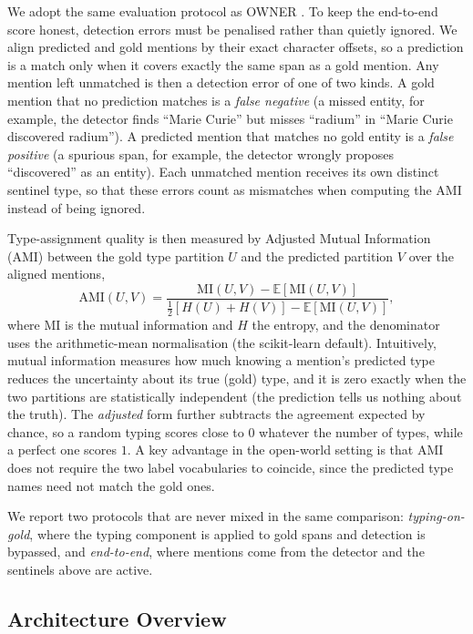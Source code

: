 \documentclass[pdflatex,sn-basic,Numbered]{sn-jnl}
\begin{document}
We adopt the same evaluation protocol as OWNER \cite{genest2025owner}.
To keep the end-to-end score honest, detection errors must be penalised rather than quietly ignored. We align predicted and gold mentions by their exact character offsets, so a prediction is a match only when it covers exactly the same span as a gold mention. Any mention left unmatched is then a detection error of one of two kinds. A gold mention that no prediction matches is a \emph{false negative} (a missed entity, for example, the detector finds ``Marie Curie'' but misses ``radium'' in ``Marie Curie discovered radium''). A predicted mention that matches no gold entity is a \emph{false positive} (a spurious span, for example, the detector wrongly proposes ``discovered'' as an entity). Each unmatched mention receives its own distinct sentinel type, so that these errors count as mismatches when computing the AMI instead of being ignored.

Type-assignment quality is then measured by Adjusted Mutual Information (AMI) \cite{vinh2010ami} between the gold type partition $U$ and the predicted partition $V$ over the aligned mentions,
\begin{equation}
\mathrm{AMI}(U,V)=\frac{\mathrm{MI}(U,V)-\mathbb{E}\!\left[\mathrm{MI}(U,V)\right]}{\tfrac12\!\left[H(U)+H(V)\right]-\mathbb{E}\!\left[\mathrm{MI}(U,V)\right]},
\end{equation}
where $\mathrm{MI}$ is the mutual information and $H$ the entropy, and the denominator uses the arithmetic-mean normalisation (the scikit-learn default). Intuitively, mutual information measures how much knowing a mention's predicted type reduces the uncertainty about its true (gold) type, and it is zero exactly when the two partitions are statistically independent (the prediction tells us nothing about the truth). The \emph{adjusted} form further subtracts the agreement expected by chance, so a random typing scores close to $0$ whatever the number of types, while a perfect one scores $1$. A key advantage in the open-world setting is that AMI does not require the two label vocabularies to coincide, since the predicted type names need not match the gold ones.

We report two protocols that are never mixed in the same comparison: \emph{typing-on-gold}, where the typing component is applied to gold spans and detection is bypassed, and \emph{end-to-end}, where mentions come from the detector and the sentinels above are active.

\subsection{Architecture Overview}
\label{sec:method:overview}
\end{document}
